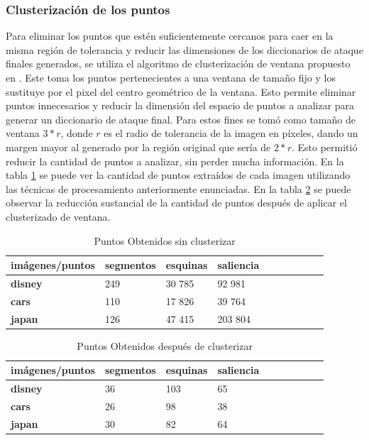 \subsubsection{Clusterizaci\'on de los puntos }
Para eliminar los puntos que est\'en suficientemente cercanos para caer en la misma regi\'on de tolerancia y reducir las dimensiones de los diccionarios de ataque finales generados, se utiliza el algoritmo de clusterizaci\'on de ventana propuesto en \cite{van2010purely}. Este toma los puntos pertenecientes a una ventana de tama\~no fijo y los sustituye por el pixel del centro geom\'etrico de la ventana. Esto permite eliminar puntos innecesarios y reducir la dimensi\'on del espacio de puntos a analizar para generar un diccionario de ataque final. Para estos fines se tom\'o como tama\~no de ventana $3*r$, donde $r$ es el radio de tolerancia de la imagen en p\'ixeles, dando un margen mayor al generado por la regi\'on original que ser\'ia de $2*r$. Esto permiti\'o reducir la cantidad de puntos a analizar, sin perder mucha informaci\'on. En la tabla \ref{points:void} se puede ver la cantidad de puntos extra\'idos de cada imagen utilizando las t\'ecnicas de procesamiento anteriormente enunciadas. En la tabla \ref{points:cluster} se puede observar la reducci\'on sustancial de la cantidad de puntos despu\'es de aplicar el clusterizado de ventana.
\begin{table}[H]
	\centering
	\caption{Puntos Obtenidos sin clusterizar}
	\label{points:void}
	\begin{tabular}{|l|l|l|l|l|l|l|l|l|l|}
		\hline
		\textbf{im\'agenes/puntos} & \textbf{segmentos } & \textbf{esquinas} & \textbf{saliencia}
		\\ \hline
		\textbf{disney} & 249 & 30 785 & 92 981 \\ \hline
		\textbf{cars} & 110 & 17 826 & 39 764 \\ \hline
		\textbf{japan} & 126 & 47 415 & 203 804  \\ \hline
	
	\end{tabular}
\end{table}

\begin{table}[H]
	\centering
	\caption{Puntos Obtenidos despu\'es de clusterizar}
		\label{points:cluster}
	\begin{tabular}{|l|l|l|l|l|l|l|l|l|l|}
		\hline
		\textbf{im\'agenes/puntos} & \textbf{segmentos} & \textbf{esquinas} & \textbf{saliencia }  \\ \hline
		\textbf{disney} & 36 & 103 & 65  \\ \hline
		\textbf{cars} & 26 & 98 & 38  \\ \hline
		\textbf{japan} & 30 & 82 & 64 \\ \hline
	\end{tabular}
\end{table}

